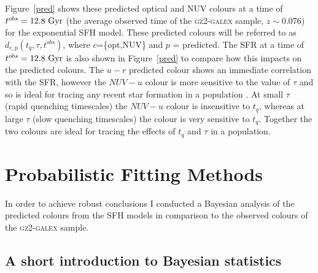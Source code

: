 Figure~\ref{pred} shows these predicted optical and NUV colours at a time of $t^{obs} = 12.8 ~\rm{Gyr}$ (the average observed time of the \textsc{gz2-galex} sample, $z \sim 0.076$) for the exponential SFH model. These predicted colours will be referred to as $d_{c,p}(t_{q}, \tau, t^{obs})$, where $c$=\{opt,NUV\} and $p$ = predicted. The SFR at a time of $t^{obs}=12.8~\rm{Gyr}$ is also shown in Figure~\ref{pred} to compare how this impacts on the predicted colours. The $u-r$ predicted colour shows an immediate correlation with the SFR, however the $NUV-u$ colour is more sensitive to the value of $\tau$ and so is ideal for tracing any recent star formation in a population . At small $\tau$ (rapid quenching timescales) the $NUV-u$ colour is insensitive to $t_{q}$, whereas at large $\tau$ (slow quenching timescales) the colour is very sensitive to $t_{q}$. Together the two colours are ideal for tracing the effects of $t_{q}$ and $\tau$ in a population. 


\section{Probabilistic Fitting Methods}\label{stats}

In order to achieve robust conclusions I conducted a Bayesian analysis \citep{Sivia, mackay03} of the predicted colours from the SFH models in comparison to the observed colours of the \textsc{gz2-galex} sample. 

\subsection{A short introduction to Bayesian statistics}

